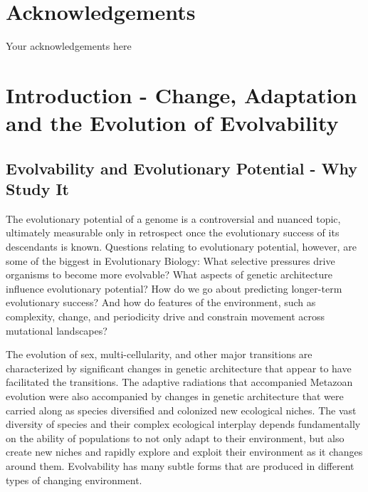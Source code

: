 \documentclass[PhD]{msu-thesis}
\begin{document}
%
\clearpage
\makecopyrightpage
\makededicationpage
%
\clearpage
\chapter*{Acknowledgements}
\DoubleSpacing
Your acknowledgements here
%
\clearpage
\SingleSpacing
\tableofcontents*
\clearpage
\listoftables
\clearpage
\listoffigures
%
\clearpage
\todototoc
\listoftodos
%
\mainmatter
\chapter{Introduction - Change, Adaptation and the Evolution of Evolvability}
\label{chap:introduction}
\section{Evolvability and Evolutionary Potential - Why Study It} 
The evolutionary potential of a genome is a controversial and nuanced topic, ultimately measurable only in retrospect once the evolutionary success of its descendants is known. Questions relating to evolutionary potential, however, are some of the biggest in Evolutionary Biology: What selective pressures drive organisms to become more evolvable? What aspects of genetic architecture influence evolutionary potential? How do we go about predicting longer-term evolutionary success? And how do features of the environment, such as complexity, change, and periodicity drive and constrain movement across mutational landscapes?

The evolution of sex, multi-cellularity, and other major transitions are characterized by significant changes in genetic architecture that appear to have facilitated the transitions\cite{smith_major_1995}. The adaptive radiations that accompanied Metazoan evolution were also accompanied by changes in genetic architecture that were carried along as species diversified and colonized new ecological niches\cite{kirschner_evolvability_1998}. %
The vast diversity of species and their complex ecological interplay depends fundamentally on the ability of populations to not only adapt to their environment, but also create new niches and rapidly explore and exploit their environment as it changes around them. 
Evolvability has many subtle forms that are produced in different types of changing environment.
\end{document}
